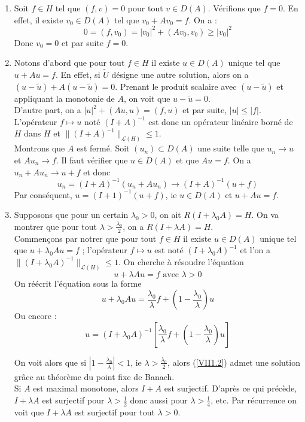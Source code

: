 \begin{dem} \begin{enumerate}
	\item Soit $f\in H$ tel que $(f,v)=0$ pour tout $v\in D(A)$. Vérifions que $f=0$. En effet, il existe $v_0\in D(A)$ tel que $v_0+Av_0=f$. On a :
	\[0=(f,v_0)=|v_0|^2+(Av_0,v_0)\geq |v_0|^2\]
Donc $v_0=0$ et par suite $f=0$.

	\item Notons d'abord que pour tout $f\in H$ il existe $u\in D(A)$ unique tel que $u+Au=f$. En effet, si $\tilde{U}$ désigne une autre solution, alors on a $(u-\tilde{u})+A(u-\tilde{u})=0$. Prenant le produit scalaire avec $(u-\tilde{u})$ et appliquant la monotonie de $A$, on voit que $u-\tilde{u}=0$.\\
D'autre part, on a $|u|^2+(Au,u)=(f,u)$ et par suite, $|u|\leq |f|$. L'opérateur $f\mapsto u$ noté $(I+A)^{-1}$ est donc un opérateur linéaire borné de $H$ dans $H$ et $\|(I+A)^{-1}\|_{\mathscr{L}(H)}\leq 1$.\\
Montrons que $A$ est fermé. Soit $(u_n)\subset D(A)$ une suite telle que $u_n\to u$ et $Au_n\to f$. Il faut vérifier que $u\in D(A)$ et que $Au=f$. On a $u_n+Au_n\to u+f$ et donc
	\[u_n=(I+A)^{-1}(u_n+Au_n)\to(I+A)^{-1}(u+f)\]
Par conséquent, $u=(I+1)^{-1}(u+f)$, ie $u\in D(A)$ et $u+Au=f$.

	\item Supposons que pour un certain $\lambda_0>0$, on ait $R(I+\lambda_0 A)=H$. On va montrer que pour tout $\lambda>\frac{\lambda_0}{2}$, on a $R(I+\lambda A)=H$. \\
Commençons par notrer que pour tout $f\in H$ il existe $u\in D(A)$ unique tel que $u+\lambda_0 Au=f$ ; l'opérateur $f\mapsto u$ est noté $(I+\lambda_0A)^{-1}$ et l'on a $\|(I+\lambda_0A)^{-1}\|_{\mathscr{L}(H)}\leq 1$. On cherche à résoudre l'équation
\[u+\lambda Au=f \text{ avec } \lambda >0\]
On réécrit l'équation sous la forme
	\[u+\lambda_0Au=\frac{\lambda_0}{\lambda}f+\left(1-\frac{\lambda_0}{\lambda}\right)u\]
Ou encore :
\begin{equation} \label{VII1.2} u=(I+\lambda_0 A)^{-1}\left[\frac{\lambda_0}{\lambda}f+\left( 1-\frac{\lambda_0}{\lambda}\right)u \right] \end{equation}

On voit alors que si $\left| 1-\frac{\lambda_0}{\lambda}\right|<1$, ie $\lambda>\frac{\lambda_0}{2}$, alors (\ref{VII1.2}) admet une solution grâce au théorème du point fixe de Banach.\\
Si $A$ est maximal monotone, alors $I+A$ est surjectif. D'après ce qui précède, $I+\lambda A$ est surjectif pour $\lambda>\frac{1}{2}$ donc aussi pour $\lambda>\frac{1}{4}$, etc. Par récurrence on voit que $I+\lambda A$ est surjectif pour tout $\lambda>0$.
\end{enumerate}\end{dem}

